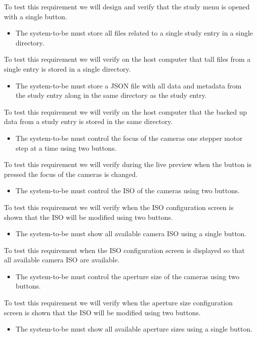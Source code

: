 To test this requirement we will design and verify that the study menu is opened with a single button.
\begin{itemize}
    \item The system-to-be must store all files related to a single study entry in a single directory.
\end{itemize}
To test this requirement we will verify on the host computer that tall files from a single entry is stored in a single directory.
\begin{itemize}
    \item The system-to-be must store a JSON file with all data and metadata from the study entry along in the same directory as the study entry.
\end{itemize}
To test this requirement we will verify on the host computer that the backed up data from a study entry is stored in the same directory.
\begin{itemize}
    \item The system-to-be must control the focus of the cameras one stepper motor step at a time using two buttons.
\end{itemize}
To test this requirement we will verify during the live preview when the button is pressed the focus of the cameras is changed.
\begin{itemize}
    \item The system-to-be must control the ISO of the cameras using two buttons.
\end{itemize}
To test this requirement we will verify when the ISO configuration screen is shown that the ISO will be modified using two buttons.
\begin{itemize}
    \item The system-to-be must show all available camera ISO using a single button.
\end{itemize}
To test this requirement when the ISO configuration screen is displayed so that all available camera ISO are available.
\begin{itemize}
    \item The system-to-be must control the aperture size of the cameras using two buttons.
\end{itemize}
To test this requirement we will verify when the aperture size configuration screen is shown that the ISO will be modified using two buttons.
\begin{itemize}
    \item The system-to-be must show all available aperture sizes using a single button.
\end{itemize}
